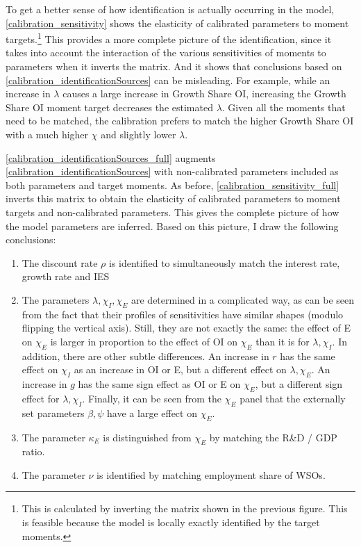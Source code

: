 \documentclass[11pt,english]{article}
\begin{document}
To get a better sense of how identification is actually occurring in the model, \autoref{calibration_sensitivity} shows the elasticity of calibrated parameters to moment targets.\footnote{This is calculated by inverting the matrix shown in the previous figure. This is feasible because the model is locally exactly identified by the target moments.} This provides a more complete picture of the identification, since it takes into account the interaction of the various sensitivities of moments to parameters when it inverts the matrix. And it shows that conclusions based on \autoref{calibration_identificationSources} can be misleading. For example, while an increase in $\lambda$ causes a large increase in Growth Share OI, increasing the Growth Share OI moment target decreases the estimated $\lambda$. Given all the moments that need to be matched, the calibration prefers to match the higher Growth Share OI with a much higher $\chi$ and slightly lower $\lambda$.

\autoref{calibration_identificationSources_full} augments \autoref{calibration_identificationSources} with non-calibrated parameters included as both parameters and target moments. As before, \autoref{calibration_sensitivity_full} inverts this matrix to obtain the elasticity of calibrated parameters to moment targets and non-calibrated parameters. This gives the complete picture of how the model parameters are inferred. Based on this picture, I draw the following conclusions:

\begin{enumerate}
	\item The discount rate $\rho$ is identified to simultaneously match the interest rate, growth rate and IES
	\item The parameters $\lambda, \chi_I, \chi_E$ are determined in a complicated way, as can be seen from the fact that their profiles of sensitivities have similar shapes (modulo flipping the vertical axis). Still, they are not exactly the same: the effect of E on $\chi_E$ is larger in proportion to the effect of OI on $\chi_E$ than it is for $\lambda, \chi_I$. In addition, there are other subtle differences. An increase in $r$ has the same effect on $\chi_I$ as an increase in OI or E, but a different effect on $\lambda, \chi_E$. An increase in $g$ has the same sign effect as OI or E on $\chi_E$, but a different sign effect for $\lambda, \chi_I$. Finally, it can be seen from the $\chi_E$ panel that the externally set parameters $\beta, \psi$ have a large effect on $\chi_E$.
	\item The parameter $\kappa_E$ is distinguished from $\chi_E$ by matching the R\&D / GDP ratio.
	\item The parameter $\nu$ is identified by matching employment share of WSOs. 
\end{enumerate}
\end{document}

